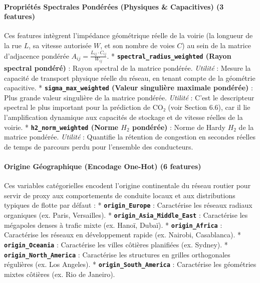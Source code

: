 \documentclass[10pt, a4paper]{article}
\begin{document}
\paragraph{Propriétés Spectrales Pondérées (Physiques \& Capacitives) (3
features)}\label{propriuxe9tuxe9s-spectrales-ponduxe9ruxe9es-physiques-capacitives-3-features}

Ces features intègrent l'impédance géométrique réelle de la voirie (la
longueur de la rue \(L\), sa vitesse autorisée \(W\), et son nombre de
voies \(C\)) au sein de la matrice d'adjacence pondérée
\(A_{ij} = \frac{L_{ij} \cdot C_{ij}}{W_{ij}}\). *
\textbf{\texttt{spectral\_radius\_weighted} (Rayon spectral pondéré)} :
Rayon spectral de la matrice pondérée. \emph{Utilité} : Mesure la
capacité de transport physique réelle du réseau, en tenant compte de la
géométrie capacitive. * \textbf{\texttt{sigma\_max\_weighted} (Valeur
singulière maximale pondérée)} : Plus grande valeur singulière de la
matrice pondérée. \emph{Utilité} : C'est le descripteur spectral le plus
important pour la prédiction de CO₂ (voir Section 6.6), car il lie
l'amplification dynamique aux capacités de stockage et de vitesse
réelles de la voirie. * \textbf{\texttt{h2\_norm\_weighted} (Norme
\(H_2\) pondérée)} : Norme de Hardy \(H_2\) de la matrice pondérée.
\emph{Utilité} : Quantifie la rétention de congestion en secondes
réelles de temps de parcours perdu pour l'ensemble des conducteurs.

\paragraph{Origine Géographique (Encodage One-Hot) (6
features)}\label{origine-guxe9ographique-encodage-one-hot-6-features}

Ces variables catégorielles encodent l'origine continentale du réseau
routier pour servir de proxy aux comportements de conduite locaux et aux
distributions typiques de flotte par défaut : *
\textbf{\texttt{origin\_Europe}} : Caractérise les réseaux radiaux
organiques (ex. Paris, Versailles). *
\textbf{\texttt{origin\_Asia\_Middle\_East}} : Caractérise les mégapoles
denses à trafic mixte (ex. Hanoï, Dubaï). *
\textbf{\texttt{origin\_Africa}} : Caractérise les réseaux en
développement rapide (ex. Nairobi, Casablanca). *
\textbf{\texttt{origin\_Oceania}} : Caractérise les villes côtières
planifiées (ex. Sydney). * \textbf{\texttt{origin\_North\_America}} :
Caractérise les structures en grilles orthogonales régulières (ex. Los
Angeles). * \textbf{\texttt{origin\_South\_America}} : Caractérise les
géométries mixtes côtières (ex. Rio de Janeiro).
\end{document}
